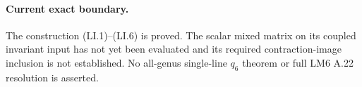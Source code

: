 \paragraph{Current exact boundary.}
The construction (LI.1)--(LI.6) is proved. The scalar
mixed matrix on its coupled invariant input has not
yet been evaluated and its required contraction-image
inclusion is not established. No all-genus single-line
$q_6$ theorem or full LM6 A.22 resolution is asserted.
